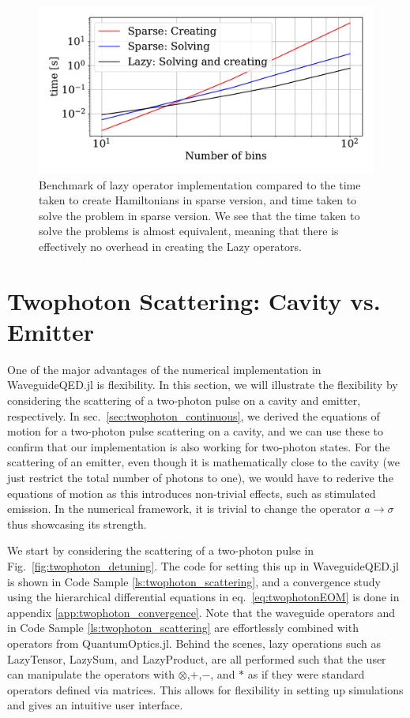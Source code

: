 \begin{figure}[H]
    \centering
    \includegraphics[width=0.6\linewidth]{figures/lazy_bench.pdf}
    \caption{Benchmark of lazy operator implementation compared to the time taken to create Hamiltonians in sparse version, and time taken to solve the problem in sparse version. We see that the time taken to solve the problems is almost equivalent, meaning that there is effectively no overhead in creating the Lazy operators.}
    \label{fig:lazybench}
\end{figure}


\section{Twophoton Scattering: Cavity vs. Emitter \label{sec:twophoton_emitter_vs_cavity}}
One of the major advantages of the numerical implementation in WaveguideQED.jl is flexibility. In this section, we will illustrate the flexibility by considering the scattering of a two-photon pulse on a cavity and emitter, respectively. In sec.~\ref{sec:twophoton_continuous}, we derived the equations of motion for a two-photon pulse scattering on a cavity, and we can use these to confirm that our implementation is also working for two-photon states. For the scattering of an emitter, even though it is mathematically close to the cavity (we just restrict the total number of photons to one), we would have to rederive the equations of motion as this introduces non-trivial effects, such as stimulated emission. In the numerical framework, it is trivial to change the operator $a \rightarrow \sigma$ thus showcasing its strength.


 We start by considering the scattering of a two-photon pulse in Fig.~\ref{fig:twophoton_detuning}. The code for setting this up in WaveguideQED.jl is shown in Code Sample \ref{ls:twophoton_scattering}, and a convergence study using the hierarchical differential equations in eq.~\eqref{eq:twophotonEOM} is done in appendix \ref{app:twophoton_convergence}. Note that the waveguide operators  and  in Code Sample \ref{ls:twophoton_scattering} are effortlessly combined with operators from QuantumOptics.jl. Behind the scenes, lazy operations such as LazyTensor, LazySum, and LazyProduct, are all performed such that the user can manipulate the operators with $\otimes$,$+$,$-$, and $*$ as if they were standard operators defined via matrices. This allows for flexibility in setting up simulations and gives an intuitive user interface. 
 
